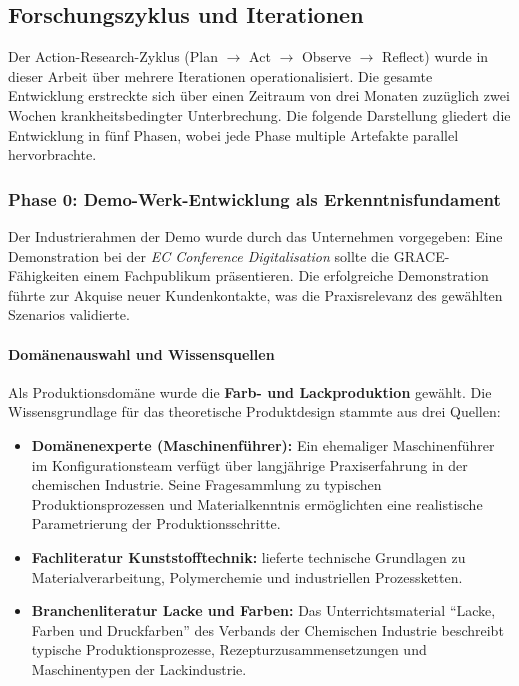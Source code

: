 \subsection{Forschungszyklus und Iterationen}
\label{subsec:Forschungszyklus}

Der Action-Research-Zyklus (Plan $\rightarrow$ Act $\rightarrow$ Observe $\rightarrow$ Reflect) wurde in dieser Arbeit über mehrere Iterationen operationalisiert. Die gesamte Entwicklung erstreckte sich über einen Zeitraum von drei Monaten zuzüglich zwei Wochen krankheitsbedingter Unterbrechung. Die folgende Darstellung gliedert die Entwicklung in fünf Phasen, wobei jede Phase multiple Artefakte parallel hervorbrachte.


\subsubsection{Phase 0: Demo-Werk-Entwicklung als Erkenntnisfundament}
\label{subsubsec:Phase0}

Der Industrierahmen der Demo wurde durch das Unternehmen vorgegeben: Eine Demonstration bei der \textit{EC Conference Digitalisation} sollte die GRACE-Fähigkeiten einem Fachpublikum präsentieren. Die erfolgreiche Demonstration führte zur Akquise neuer Kundenkontakte, was die Praxisrelevanz des gewählten Szenarios validierte.

\paragraph{Domänenauswahl und Wissensquellen}

Als Produktionsdomäne wurde die \textbf{Farb- und Lackproduktion} gewählt. Die Wissensgrundlage für das theoretische Produktdesign stammte aus drei Quellen:

\begin{itemize}
    \item \textbf{Domänenexperte (Maschinenführer):} Ein ehemaliger Maschinenführer im Konfigurationsteam verfügt über langjährige Praxiserfahrung in der chemischen Industrie. Seine Fragesammlung zu typischen Produktionsprozessen und Materialkenntnis ermöglichten eine realistische Parametrierung der Produktionsschritte.

    \item \textbf{Fachliteratur Kunststofftechnik:} \cite{schwarz:kunststoffkunde1987} lieferte technische Grundlagen zu Materialverarbeitung, Polymerchemie und industriellen Prozessketten.

    \item \textbf{Branchenliteratur Lacke und Farben:} Das Unterrichtsmaterial ``Lacke, Farben und Druckfarben'' des Verbands der Chemischen Industrie \citep{vci:lacke_farben2018} beschreibt typische Produktionsprozesse, Rezepturzusammensetzungen und Maschinentypen der Lackindustrie.
\end{itemize}

